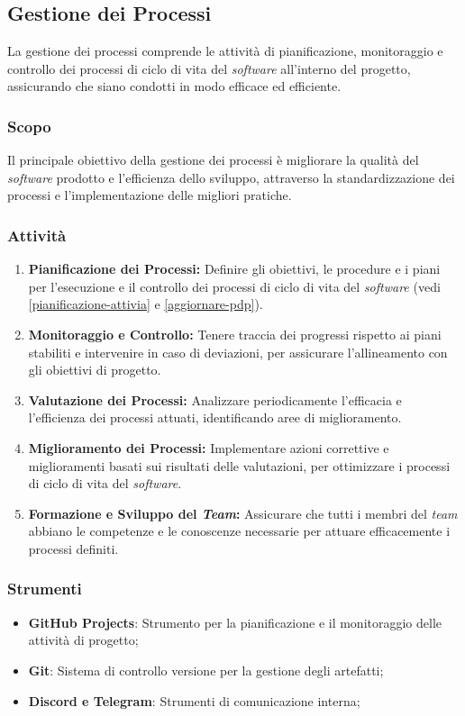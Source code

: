 \subsection{Gestione dei Processi}

La gestione dei processi comprende le attività di pianificazione, monitoraggio
e controllo dei processi di ciclo di vita del \textit{software} all'interno del
progetto, assicurando che siano condotti in modo efficace ed efficiente.

\subsubsection{Scopo}
Il principale obiettivo della gestione dei processi è migliorare la qualità
del \textit{software} prodotto e l'efficienza dello sviluppo, attraverso la
standardizzazione dei processi e l'implementazione delle migliori pratiche.

\subsubsection{Attività}
\begin{enumerate}
	\item \textbf{Pianificazione dei Processi:} Definire gli obiettivi, le
	      procedure e i piani per l'esecuzione e il controllo dei processi di
	      ciclo di vita del \textit{software} (vedi
	      \cref{pianificazione-attivia} e \cref{aggiornare-pdp}).
	\item \textbf{Monitoraggio e Controllo:} Tenere traccia dei progressi
	      rispetto ai piani stabiliti e intervenire in caso di deviazioni, per
	      assicurare l'allineamento con gli obiettivi di progetto.
	\item \textbf{Valutazione dei Processi:} Analizzare periodicamente
	      l'efficacia e l'efficienza dei processi attuati, identificando aree di
	      miglioramento.
	\item \textbf{Miglioramento dei Processi:} Implementare azioni correttive e
	      miglioramenti basati sui risultati delle valutazioni, per ottimizzare
	      i processi di ciclo di vita del \textit{software}.
	\item \textbf{Formazione e Sviluppo del \textit{Team}:} Assicurare che tutti i membri
	      del \textit{team} abbiano le competenze e le conoscenze necessarie per attuare
	      efficacemente i processi definiti.
\end{enumerate}

\subsubsection{Strumenti}
\begin{itemize}
	\item \textbf{GitHub Projects}: Strumento per la pianificazione e il
	      monitoraggio delle attività di progetto;

	\item \textbf{Git}: Sistema di controllo versione per la gestione degli
	      artefatti;

	\item \textbf{Discord e Telegram}: Strumenti di comunicazione interna;
\end{itemize}
